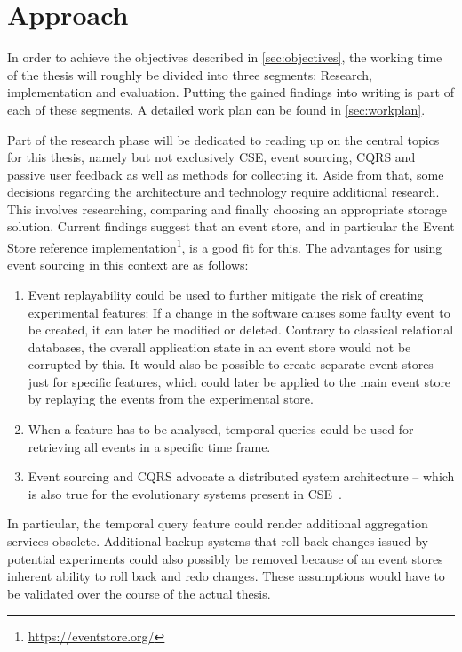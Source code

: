 %
\chapter{Approach}
\label{sec:approach}

In order to achieve the objectives described in \cref{sec:objectives}, the working time of the thesis will roughly be divided into three segments: Research, implementation and evaluation.
Putting the gained findings into writing is part of each of these segments.
A detailed work plan can be found in \cref{sec:workplan}.

Part of the research phase will be dedicated to reading up on the central topics for this thesis, namely but not exclusively \acf{CSE}, event sourcing, \acf{CQRS} and passive user feedback as well as methods for collecting it.
Aside from that, some decisions regarding the architecture and technology require additional research.
This involves researching, comparing and finally choosing an appropriate storage solution.
Current findings suggest that an event store, and in particular the Event Store reference implementation\footnote{\url{https://eventstore.org/}}, is a good fit for this.
The advantages for using event sourcing in this context are as follows:

\begin{enumerate}
\item Event replayability could be used to further mitigate the risk of creating experimental features: If a change in the software causes some faulty event to be created, it can later be modified or deleted.
Contrary to classical relational databases, the overall application state in an event store would not be corrupted by this.
It would also be possible to create separate event stores just for specific features, which could later be applied to the main event store by replaying the events from the experimental store.
\item When a feature has to be analysed, temporal queries could be used for retrieving all events in a specific time frame.
\item Event sourcing and \ac{CQRS} advocate a distributed system architecture -- which is also true for the evolutionary systems present in \ac{CSE}~\cite{ford2017building}.
\end{enumerate}

In particular, the temporal query feature could render additional aggregation services obsolete.
Additional backup systems that roll back changes issued by potential experiments could also possibly be removed because of an event stores inherent ability to roll back and redo changes.
These assumptions would have to be validated over the course of the actual thesis.

